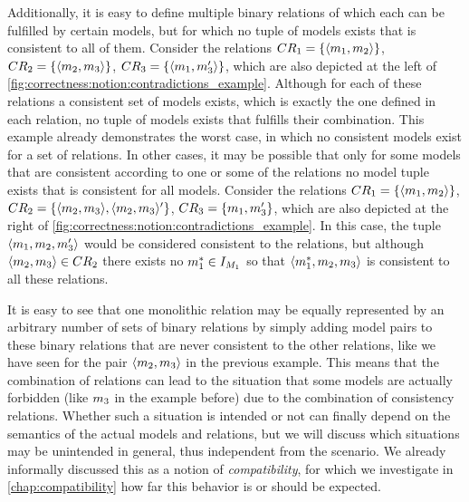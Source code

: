 Additionally, it is easy to define multiple binary relations of which each can be fulfilled by certain models, but for which no tuple of models exists that is consistent to all of them. Consider the relations $CR_{1} = \{ \langle m_{1}, m_{2} \rangle \}$, $CR_{2} = \{ \langle m_{2}, m_{3} \rangle \}$, $CR_{3} = \{ \langle m_{1}, m_{3}' \rangle \}$, which are also depicted at the left of \autoref{fig:correctness:notion:contradictions_example}.
Although for each of these relations a consistent set of models exists, which is exactly the one defined in each relation, no tuple of models exists that fulfills their combination.
This example already demonstrates the worst case, in which no consistent models exist for a set of relations.
In other cases, it may be possible that only for some models that are consistent according to one or some of the relations no model tuple exists that is consistent for all models.
Consider the relations $CR_{1} = \{ \langle m_{1}, m_{2} \rangle \}$, $CR_{2} = \{ \langle m_{2}, m_{3} \rangle, \langle m_{2}, m_{3} \rangle' \}$, $CR_{3} = \{ m_{1}, m_{3}' \}$, which are also depicted at the right of \autoref{fig:correctness:notion:contradictions_example}.
In this case, the tuple $\langle m_{1}, m_{2}, m_{3}' \rangle$ would be considered consistent to the relations, but although $\langle m_{2}, m_{3} \rangle \in CR_{2}$ there exists no $m^*_{1} \in I_{M_{1}}$ so that $\langle m^*_{1}, m_{2}, m_{3} \rangle$ is consistent to all these relations.

It is easy to see that one monolithic relation may be equally represented by an arbitrary number of sets of binary relations by simply adding model pairs to these binary relations that are never consistent to the other relations, like we have seen for the pair $\langle m_{2}, m_{3} \rangle$ in the previous example.
This means that the combination of relations can lead to the situation that some models are actually forbidden (like $m_{3}$ in the example before) due to the combination of consistency relations.
Whether such a situation is intended or not can finally depend on the semantics of the actual models and relations, but we will discuss which situations may be unintended in general, thus independent from the scenario.
We already informally discussed this as a notion of \emph{compatibility}, for which we investigate in \autoref{chap:compatibility} how far this behavior is or should be expected.


